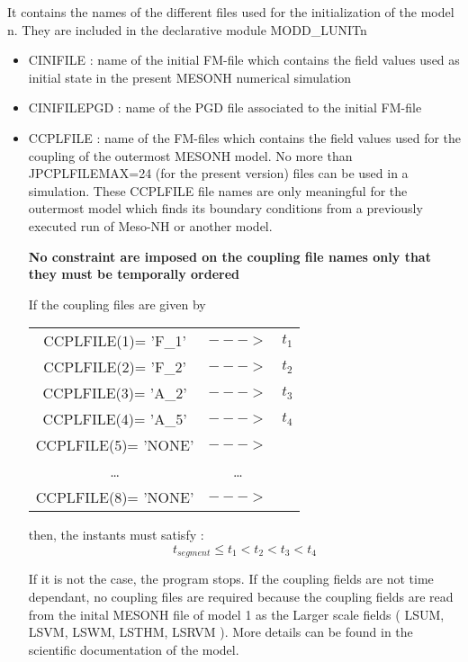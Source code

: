 It contains the names  of the different files used for the initialization of
 the model n. They are
included in the declarative module MODD\_LUNITn
\begin{itemize}
\item
{}
CINIFILE : name of the initial FM-file which contains the field values
  used as initial state in the present MESONH numerical simulation
\item
{}
CINIFILEPGD : name of the PGD file  associated to the initial FM-file
\item
{}
CCPLFILE : name of the FM-files which contains the field values used for the
coupling of the outermost MESONH model. No more than JPCPLFILEMAX=24 (for the
present version) files can be
used in a simulation. These CCPLFILE file names are only meaningful for the
outermost model which finds its boundary conditions from a previously executed 
run of Meso-NH or another model.

 {\bf No constraint are imposed on the coupling file names only that they must
be temporally ordered }

If the coupling files are given  by

\begin{tabular}{ccc}
CCPLFILE(1)= 'F\_1' & $--->$ & $t_1$ \\
CCPLFILE(2)= 'F\_2'  & $--->$ & $t_2$ \\
CCPLFILE(3)= 'A\_2'  & $--->$ & $t_3$ \\
CCPLFILE(4)= 'A\_5'  & $--->$ & $t_4$ \\
CCPLFILE(5)= 'NONE' & $--->$ &  \\
\ldots                 & \ldots &  \\
CCPLFILE(8)= 'NONE' & $--->$ &  
\end{tabular} 

then, the instants must satisfy :
$$ t_{segment} \leq t_1 < t_2  < t_3  < t_4  $$

If it is not the case, the program stops. If the coupling fields are 
not time dependant, no coupling files are required because the coupling fields 
are read from the inital MESONH file of model 1 as the Larger
scale fields ( LSUM, LSVM, LSWM, LSTHM, LSRVM ). More details can be found in
the scientific documentation of the model.
\end{itemize}

